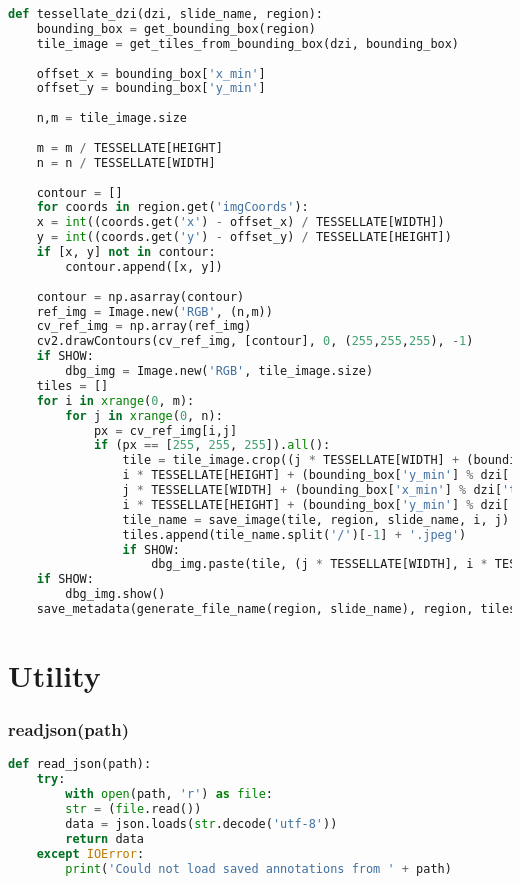 \begin{lstlisting}[frame=single,language=python]
def tessellate_dzi(dzi, slide_name, region):
	bounding_box = get_bounding_box(region)
	tile_image = get_tiles_from_bounding_box(dzi, bounding_box)
	
	offset_x = bounding_box['x_min']
	offset_y = bounding_box['y_min']
	
	n,m = tile_image.size
	
	m = m / TESSELLATE[HEIGHT]
	n = n / TESSELLATE[WIDTH]
	
	contour = []
	for coords in region.get('imgCoords'):
	x = int((coords.get('x') - offset_x) / TESSELLATE[WIDTH])
	y = int((coords.get('y') - offset_y) / TESSELLATE[HEIGHT])
	if [x, y] not in contour:
		contour.append([x, y])
	
	contour = np.asarray(contour)
	ref_img = Image.new('RGB', (n,m))
	cv_ref_img = np.array(ref_img)
	cv2.drawContours(cv_ref_img, [contour], 0, (255,255,255), -1)
	if SHOW:
		dbg_img = Image.new('RGB', tile_image.size)
	tiles = []
	for i in xrange(0, m):
		for j in xrange(0, n):
			px = cv_ref_img[i,j]
			if (px == [255, 255, 255]).all():
				tile = tile_image.crop((j * TESSELLATE[WIDTH] + (bounding_box['x_min'] % dzi['tile_size']),
				i * TESSELLATE[HEIGHT] + (bounding_box['y_min'] % dzi['tile_size']),
				j * TESSELLATE[WIDTH] + (bounding_box['x_min'] % dzi['tile_size']) + TESSELLATE[WIDTH],
				i * TESSELLATE[HEIGHT] + (bounding_box['y_min'] % dzi['tile_size']) + TESSELLATE[HEIGHT]))
				tile_name = save_image(tile, region, slide_name, i, j)
				tiles.append(tile_name.split('/')[-1] + '.jpeg')
				if SHOW:
					dbg_img.paste(tile, (j * TESSELLATE[WIDTH], i * TESSELLATE[HEIGHT]))
	if SHOW:
		dbg_img.show()
	save_metadata(generate_file_name(region, slide_name), region, tiles)
\end{lstlisting}


\section{Utility}

\subsubsection{read{\textunderscore}json(path)}

\begin{lstlisting}[frame=single,language=python]
def read_json(path):
	try:
		with open(path, 'r') as file:
		str = (file.read())
		data = json.loads(str.decode('utf-8'))
		return data
	except IOError:
		print('Could not load saved annotations from ' + path)
\end{lstlisting}


